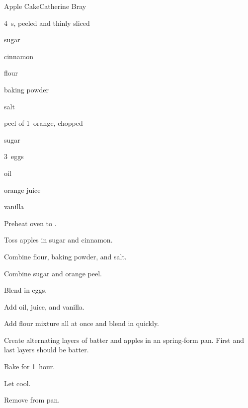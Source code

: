 \begin{recipe}{Apple Cake}{Catherine Bray}{}

\begin{ingredients}
\item 4~s, peeled and thinly sliced
\item \C{\third} sugar
\item {} cinnamon
\item {} flour
\item {} baking powder
\item \tp{\quarter} salt
\item peel of 1~orange, chopped
\item \C{1\half} sugar
\item 3~eggs
\item \C{\twothird} oil
\item {} orange juice
\item {} vanilla
\end{ingredients}

\begin{directions}
\item Preheat oven to .
\item Toss apples in \C{\third} sugar and cinnamon.
\item Combine flour, baking powder, and salt.
\item Combine \C{1\half} sugar and orange peel.
\item Blend in eggs.
\item Add oil, juice, and vanilla.
\item Add flour mixture all at once and blend in quickly.
\item Create alternating layers of batter and apples in an  spring-form pan. First and last layers should be batter.
\item Bake for 1~hour.
\item Let cool.
\item Remove from pan.
\end{directions}

\end{recipe}
